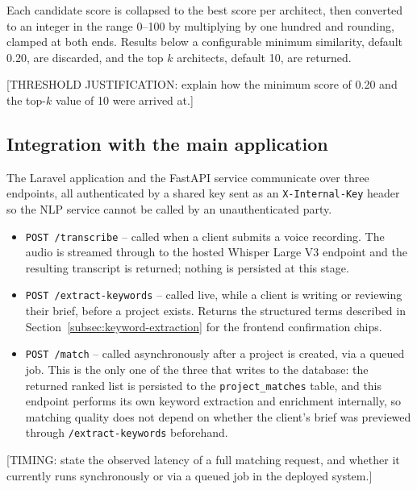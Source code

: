 Each candidate score is collapsed to the best score per architect, then
converted to an integer in the range 0--100 by multiplying by one
hundred and rounding, clamped at both ends. Results below a configurable
minimum similarity, default 0.20, are discarded, and the top $k$
architects, default 10, are returned.

[THRESHOLD JUSTIFICATION: explain how the minimum score of 0.20 and the
top-$k$ value of 10 were arrived at.]

\subsection{Integration with the main application}
\label{subsec:nlp-integration}

The Laravel application and the FastAPI service communicate over three
endpoints, all authenticated by a shared key sent as an
\texttt{X-Internal-Key} header so the NLP service cannot be called by
an unauthenticated party.

\begin{itemize}[leftmargin=*, itemsep=2pt]
  \item \texttt{POST /transcribe} -- called when a client submits a
        voice recording. The audio is streamed through to the hosted
        Whisper Large V3 endpoint and the resulting transcript is
        returned; nothing is persisted at this stage.
  \item \texttt{POST /extract-keywords} -- called live, while a client
        is writing or reviewing their brief, before a project exists.
        Returns the structured terms described in
        Section~\ref{subsec:keyword-extraction} for the frontend
        confirmation chips.
  \item \texttt{POST /match} -- called asynchronously after a project is
        created, via a queued job. This is the only one of the three
        that writes to the database: the returned ranked list is
        persisted to the \texttt{project\_matches} table, and this
        endpoint performs its own keyword extraction and enrichment
        internally, so matching quality does not depend on whether the
        client's brief was previewed through
        \texttt{/extract-keywords} beforehand.
\end{itemize}

[TIMING: state the observed latency of a full matching request, and
whether it currently runs synchronously or via a queued job in the
deployed system.]

